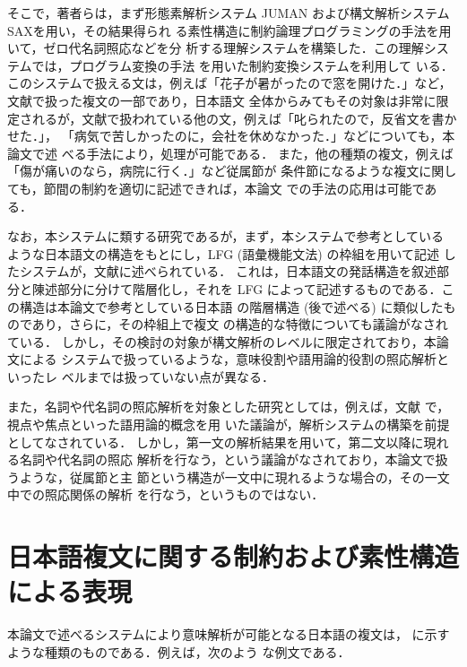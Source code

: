そこで，著者らは，まず形態素解析システム JUMAN\cite{松本:NewJUMANmanual}
および構文解析システム SAX\cite{松本:NewSAXmanual}を用い，その結果得られ
る素性構造に制約論理プログラミングの手法を用いて，ゼロ代名詞照応などを分
析する理解システムを構築した．この理解システムでは，プログラム変換の手法
を用いた制約変換システム\cite{森:否定情報の扱える制約システム}を利用して
いる．
このシステムで扱える文は，例えば「花子が暑がったので窓を開けた．」など，
文献\cite{中川:複文の意味論,COLING94}で扱った複文の一部であり，日本語文
全体からみてもその対象は非常に限定されるが，文献\cite{中川:複文の意味論,
COLING94}で扱われている他の文，例えば「叱られたので，反省文を書かせた．」，
「病気で苦しかったのに，会社を休めなかった．」などについても，本論文で述
べる手法により，処理が可能である．
また，他の種類の複文，例えば「傷が痛いのなら，病院に行く．」など従属節が
条件節になるような複文に関しても，節間の制約を適切に記述できれば，本論文
での手法の応用は可能である．

なお，本システムに類する研究であるが，まず，本システムで参考としている
ような日本語文の構造をもとにし，LFG (語彙機能文法) の枠組を用いて記述
したシステムが，文献\cite{水野:日本語の文の構造}に述べられている．
これは，日本語文の発話構造を叙述部分と陳述部分に分けて階層化し，それを 
LFG によって記述するものである．この構造は本論文で参考としている日本語
の階層構造 (後で述べる) に類似したものであり，さらに，その枠組上で複文
の構造的な特徴についても議論がなされている．
しかし，その検討の対象が構文解析のレベルに限定されており，本論文による
システムで扱っているような，意味役割や語用論的役割の照応解析といったレ
ベルまでは扱っていない点が異なる．

また，名詞や代名詞の照応解析を対象とした研究としては，例えば，文献
\cite{清水:日本語談話の照応解決}で，視点や焦点といった語用論的概念を用
いた議論が，解析システムの構築を前提としてなされている．
しかし，第一文の解析結果を用いて，第二文以降に現れる名詞や代名詞の照応
解析を行なう，という議論がなされており，本論文で扱うような，従属節と主
節という構造が一文中に現れるような場合の，その一文中での照応関係の解析
を行なう，というものではない．

\section{日本語複文に関する制約および素性構造による表現}
\label{節:複文の制約}

本論文で述べるシステムにより意味解析が可能となる日本語の複文は， 
に示すような種類のものである．例えば，次のよう
な例文である．

